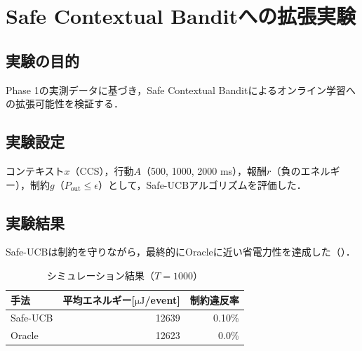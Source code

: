\section{Safe Contextual Banditへの拡張実験}
\label{sec:phase2_concept}

\subsection{実験の目的}

Phase 1の実測データに基づき，Safe Contextual Banditによるオンライン学習への拡張可能性を検証する．

\subsection{実験設定}

コンテキスト$x$（CCS），行動$A$（500, 1000, 2000 ms），報酬$r$（負のエネルギー），制約$g$（$P_{\mathrm{out}}\le\epsilon$）として，Safe-UCBアルゴリズムを評価した．

\subsection{実験結果}

Safe-UCBは制約を守りながら，最終的にOracleに近い省電力性を達成した（）．

\begin{table}[tb]
  \centering
  \caption{シミュレーション結果（$T=1000$）}
  \begin{tabular}{lrr}
    \toprule
    手法 & 平均エネルギー[$\si{\micro\joule}$/event] & 制約違反率 \\
    \midrule
    Safe-UCB & 12639 & 0.10\% \\
    Oracle & 12623 & 0.0\% \\
    \bottomrule
  \end{tabular}
\end{table}

\clearpage
